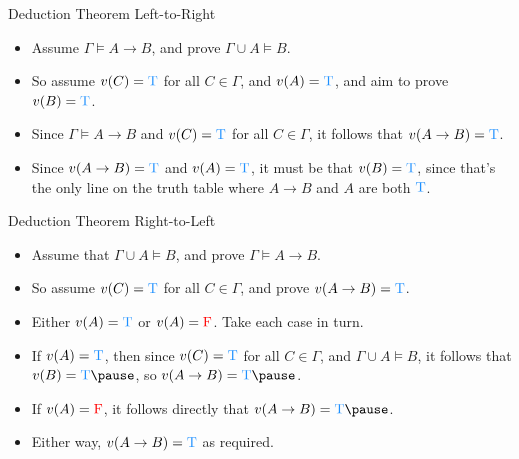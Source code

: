 \documentclass[
  ignorenonframetext,
]{beamer}
\providecommand{\tightlist}{%
  \setlength{\itemsep}{0pt}\setlength{\parskip}{0pt}}
\renewcommand{\,}{\text{, }}
\def\True{\textcolor{dodgerblue}{\text{T}}}
\def\False{\textcolor{red}{\text{F}}}
\begin{document}
\begin{frame}{Deduction Theorem Left-to-Right}
\protect\hypertarget{deduction-theorem-left-to-right}{}

\begin{itemize}
\tightlist
\item
  Assume \(\Gamma \vDash A \rightarrow B\), and prove
  \(\Gamma \cup A \vDash B\).
\item
  So assume \(v(C) = \True\) for all \(C \in \Gamma\), and
  \(v(A) = \True\), and aim to prove \(v(B) = \True\).\pause
\item
  Since \(\Gamma \vDash A \rightarrow B\) and \(v(C) = \True\) for all
  \(C \in \Gamma\), it follows that
  \(v(A \rightarrow B) = \True\).\pause
\item
  Since \(v(A \rightarrow B) = \True\) and \(v(A) = \True\), it must be
  that \(v(B) = \True\), since that's the only line on the truth table
  where \(A \rightarrow B\) and \(A\) are both \(\True\).
\end{itemize}

\end{frame}

\begin{frame}{Deduction Theorem Right-to-Left}
\protect\hypertarget{deduction-theorem-right-to-left}{}

\begin{itemize}
\tightlist
\item
  Assume that \(\Gamma \cup A \vDash B\), and prove
  \(\Gamma \vDash A \rightarrow B\).
\item
  So assume \(v(C) = \True\) for all \(C \in \Gamma\), and prove
  \(v(A \rightarrow B) = \True\). \pause
\item
  Either \(v(A) = \True\) or \(v(A) = \False\). Take each case in
  turn.\pause
\item
  If \(v(A) = \True\), then since \(v(C) = \True\) for all
  \(C \in \Gamma\), and \(\Gamma \cup A \vDash B\), it follows that
  \(v(B) = \True \pause\), so \(v(A \rightarrow B) = \True \pause\).
\item
  If \(v(A) = \False\), it follows directly that
  \(v(A \rightarrow B) = \True \pause\).
\item
  Either way, \(v(A \rightarrow B) = \True\) as required.
\end{itemize}

\end{frame}
\end{document}
